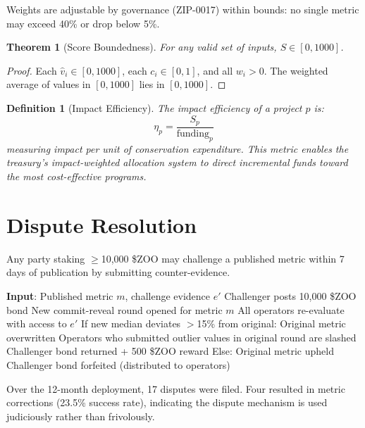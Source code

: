 \documentclass[11pt,letterpaper]{article}
\newtheorem{theorem}{Theorem}[section]
\newtheorem{definition}{Definition}[section]
\begin{document}
Weights are adjustable by governance (ZIP-0017) within bounds: no single metric may exceed 40\% or drop below 5\%.

\begin{theorem}[Score Boundedness]
For any valid set of inputs, $S \in [0, 1000]$.
\end{theorem}

\begin{proof}
Each $\hat{v}_i \in [0, 1000]$, each $c_i \in [0, 1]$, and all $w_i > 0$. The weighted average of values in $[0, 1000]$ lies in $[0, 1000]$.
\end{proof}

\begin{definition}[Impact Efficiency]
The impact efficiency of a project $p$ is:
\begin{equation}
\eta_p = \frac{S_p}{\text{funding}_p}
\end{equation}
measuring impact per unit of conservation expenditure. This metric enables the treasury's impact-weighted allocation system to direct incremental funds toward the most cost-effective programs.
\end{definition}

\section{Dispute Resolution}
\label{sec:disputes}

Any party staking $\geq$10{,}000 \$ZOO may challenge a published metric within 7 days of publication by submitting counter-evidence.

\begin{algorithm}[t]
\caption{Dispute Resolution}
\label{alg:dispute}
\begin{algorithmic}[1]
\STATE \textbf{Input}: Published metric $m$, challenge evidence $e'$
\STATE Challenger posts 10{,}000 \$ZOO bond
\STATE {}
\STATE New commit-reveal round opened for metric $m$
\STATE All operators re-evaluate with access to $e'$
\STATE If new median deviates $>$15\% from original:
\STATE \quad Original metric overwritten
\STATE \quad Operators who submitted outlier values in original round are slashed
\STATE \quad Challenger bond returned + 500 \$ZOO reward
\STATE Else:
\STATE \quad Original metric upheld
\STATE \quad Challenger bond forfeited (distributed to operators)
\end{algorithmic}
\end{algorithm}

Over the 12-month deployment, 17 disputes were filed. Four resulted in metric corrections (23.5\% success rate), indicating the dispute mechanism is used judiciously rather than frivolously.
\end{document}
